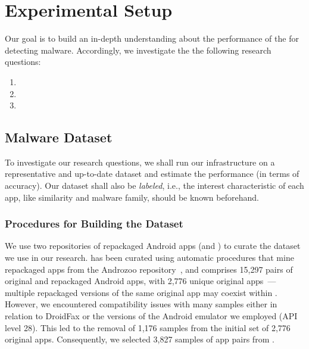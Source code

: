 \section{Experimental Setup}\label{sec:experimentalSetup}

Our goal is to build an in-depth understanding about
the performance of the \mas for detecting malware.  Accordingly,
we investigate the the following research questions:

\begin{enumerate}[(RQ1)]
\item \rqa
\item \rqc
\item \rqd
\end{enumerate}



\subsection{Malware Dataset}\label{sec:dataset}


To investigate our research questions, we shall run our infrastructure on a representative and up-to-date dataset and estimate the \mas performance (in terms of accuracy). Our dataset shall also
be \textit{labeled}, i.e., the interest characteristic of each app, like similarity and malware family, should be known beforehand. 

\subsubsection{Procedures for Building the Dataset}

We use two repositories of repackaged Android apps (\repack and \amc) to
curate the dataset we use in our research. \repack has been curated using automatic procedures that mine repackaged apps from the Androzoo
repository~\cite{DBLP:conf/msr/AllixBKT16}, and
comprises 15,297 pairs of original and repackaged Android apps, with 2,776 unique original apps~\cite{DBLP:journals/tse/LiBK21}---
multiple repackaged versions of the same original app may coexist within \repack.
However, we encountered compatibility issues with many samples either in relation to DroidFax or the versions of the Android emulator we employed (API level 28).
This led to the removal of 1,176 samples from the initial set of 2,776 original apps. Consequently, we selected 3,827 samples of app pairs from \repack.


